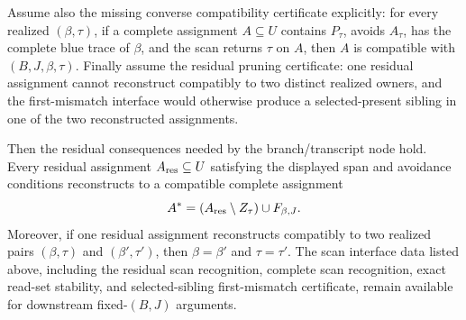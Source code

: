\begin{helper}
Assume also the missing converse compatibility certificate explicitly: for
every realized \((\beta,\tau)\), if a complete assignment \(A\subseteq U\)
contains \(P_\tau\), avoids \(A_\tau\), has the complete blue trace of
\(\beta\), and the scan returns \(\tau\) on \(A\), then \(A\) is compatible
with \((B,J,\beta,\tau)\).  Finally assume the residual pruning certificate:
one residual assignment cannot reconstruct compatibly to two distinct
realized owners, and the first-mismatch interface would otherwise produce a
selected-present sibling in one of the two reconstructed assignments.

Then the residual consequences needed by the branch/transcript node hold.
Every residual assignment \(A_{\rm res}\subseteq U\) satisfying the displayed
span and avoidance conditions reconstructs to a compatible complete
assignment
\[
A^\ast=(A_{\rm res}\setminus Z_\tau)\cup F_{\beta,J}.
\]
Moreover, if one residual assignment reconstructs compatibly to two realized
pairs \((\beta,\tau)\) and \((\beta',\tau')\), then
\(\beta=\beta'\) and \(\tau=\tau'\).  The scan interface data listed above,
including the residual scan recognition, complete scan recognition, exact
read-set stability, and selected-sibling first-mismatch certificate, remain
available for downstream fixed-\((B,J)\) arguments.
\end{helper}
